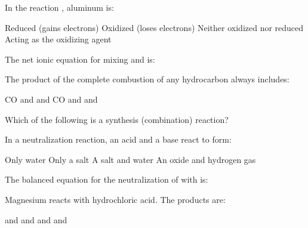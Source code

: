 \documentclass[addpoints]{exam}
\begin{document}
\begin{questions}
\question[1] In the reaction , aluminum is:
\begin{choices}
    \choice Reduced (gains electrons)
    \correctchoice Oxidized (loses electrons)
    \choice Neither oxidized nor reduced
    \choice Acting as the oxidizing agent
\end{choices}

\question[1] The net ionic equation for mixing  and  is:
\begin{choices}
    \choice {}
    \correctchoice {}
    \choice {}
    \choice {}
\end{choices}

\question[1] The product of the complete combustion of any hydrocarbon always includes:
\begin{choices}
    \choice CO and 
    \correctchoice {} and 
    \choice CO and 
    \choice {} and 
\end{choices}

\question[1] Which of the following is a synthesis (combination) reaction?
\begin{choices}
    \choice {}
    \correctchoice {}
    \choice {}
    \choice {}
\end{choices}

\question[1] In a neutralization reaction, an acid and a base react to form:
\begin{choices}
    \choice Only water
    \choice Only a salt
    \correctchoice A salt and water
    \choice An oxide and hydrogen gas
\end{choices}

\question[1] The balanced equation for the neutralization of  with  is:
\begin{choices}
    \choice {}
    \correctchoice {}
    \choice {}
    \choice {}
\end{choices}

\question[1] Magnesium reacts with hydrochloric acid. The products are:
\begin{choices}
    \choice {} and 
    \correctchoice {} and 
    \choice {} and 
    \choice {} and 
\end{choices}


\end{questions}
\end{document}

